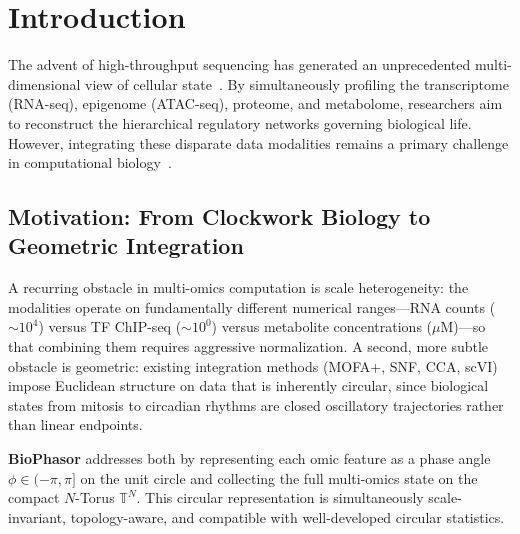 \documentclass[preprint,12pt,amsmath,amssymb,superscriptaddress,floatfix]{revtex4-2}
\begin{document}

\maketitle


\section{Introduction}

The advent of high-throughput sequencing has generated an unprecedented
multi-dimensional view of cellular state~\cite{ref_001,ref_003,ref_004,ref_005,ref_007}.
By simultaneously profiling the transcriptome (RNA-seq), epigenome (ATAC-seq),
proteome, and metabolome, researchers aim to reconstruct the hierarchical
regulatory networks governing biological life.
However, integrating these disparate data modalities remains a primary challenge
in computational biology~\cite{ref_010}.

\subsection{Motivation: From Clockwork Biology to Geometric Integration}

A recurring obstacle in multi-omics computation is scale heterogeneity:
the modalities operate on fundamentally different numerical ranges---RNA
counts ($\sim 10^4$) versus TF ChIP-seq ($\sim 10^0$) versus metabolite
concentrations ($\mu$M)---so that combining them requires aggressive
normalization. A second, more subtle obstacle is geometric: existing
integration methods (MOFA+, SNF, CCA, scVI) impose Euclidean structure on
data that is inherently circular, since biological states from mitosis to
circadian rhythms are closed oscillatory trajectories rather than linear
endpoints.

\textbf{BioPhasor} addresses both by representing each omic feature as a
phase angle $\phi \in (-\pi,\pi]$ on the unit circle and collecting the full
multi-omics state on the compact $N$-Torus $\mathbb{T}^N$.
This circular representation is simultaneously scale-invariant, topology-aware,
and compatible with well-developed circular statistics.
\end{document}
